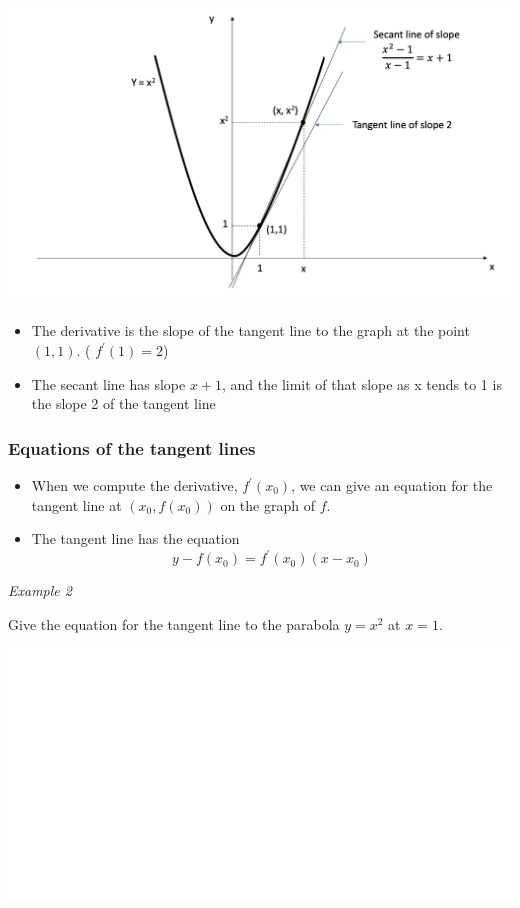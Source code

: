 \documentclass[]{book}
\providecommand{\tightlist}{%
  \setlength{\itemsep}{0pt}\setlength{\parskip}{0pt}}
\begin{document}
\begin{center}\includegraphics[width=1\linewidth]{figure/5Derivatives-4} \end{center}

\begin{itemize}
\tightlist
\item
  The derivative is the slope of the tangent line to the graph at the point \((1,1)\). ( \(f^\prime(1) = 2\))
\item
  The secant line has slope \(x+1\), and the limit of that slope as x tends to 1 is the slope 2 of the tangent line
\end{itemize}

\hypertarget{equations-of-the-tangent-lines}{%
\subsubsection{Equations of the tangent lines}\label{equations-of-the-tangent-lines}}

\begin{itemize}
\tightlist
\item
  When we compute the derivative, \(f^\prime(x_0)\), we can give an equation for the tangent line at \((x_0, f(x_0))\) on the graph of \(f\).
\item
  The tangent line has the equation \[y-f(x_0)= f^\prime(x_0)(x-x_0)\]
\end{itemize}

\newpage

\emph{Example 2}

Give the equation for the tangent line to the parabola \(y=x^2\) at \(x=1\).

\begin{center}\includegraphics[width=1\linewidth]{figure/Devbox2-1} \end{center}
\end{document}

